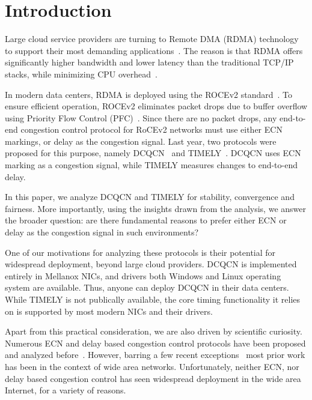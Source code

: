 \section{Introduction}

Large cloud service providers are turning to Remote DMA (RDMA) technology to
support their most demanding
applications~\cite{dcqcn,timely,tcp-bolt,erasure-storage,farm,pilaf}.  The
reason is that RDMA offers significantly higher bandwidth and lower latency than
the traditional TCP/IP stacks, while minimizing CPU
overhead~\cite{dcqcn,farm,timely}. 

In modern data centers, RDMA is deployed using the ROCEv2
standard~\cite{rocev2}. To ensure efficient operation, ROCEv2 eliminates packet
drops due to buffer overflow using Priority Flow Control (PFC)~\cite{pfc}.
Since there are no packet drops, any end-to-end congestion control protocol for
RoCEv2 networks must use either ECN markings, or delay as the congestion signal.
Last year, two protocols were proposed for this purpose, namely
DCQCN~\cite{dcqcn} and TIMELY~\cite{timely}. DCQCN uses ECN marking as a
congestion signal, while TIMELY measures changes to end-to-end delay.


In this paper, we analyze DCQCN and TIMELY for stability, convergence and
fairness. More importantly, using the insights drawn from the analysis, we
answer the broader question: are there fundamental reasons to prefer either ECN
or delay as the congestion signal in such environments?


One of our motivations for analyzing these protocols is their potential for
widespread deployment, beyond large cloud providers.  DCQCN is implemented
entirely in Mellanox NICs, and drivers both Windows and Linux operating system
are available. Thus, anyone can deploy DCQCN in their data centers. While TIMELY
is not publically available, the core timing functionality it relies on is
supported by most modern NICs and their drivers.

Apart from this practical consideration, we are also driven by scientific
curiosity.  Numerous ECN and delay based congestion control protocols have been
proposed and analyzed before~\cite{ecn, tcp-vegas,
Hollot:PIController,misra2000fluid,hollot2001designing,misra:TAC2002,gorinsky2004feedback}.
However, barring a few recent exceptions~\cite{dctcp-analysis, qcn-analysis}
most prior work has been in the context of wide area networks.  Unfortunately,
neither ECN, nor delay based congestion control has seen widespread deployment
in the wide area Internet, for a variety of reasons. 

